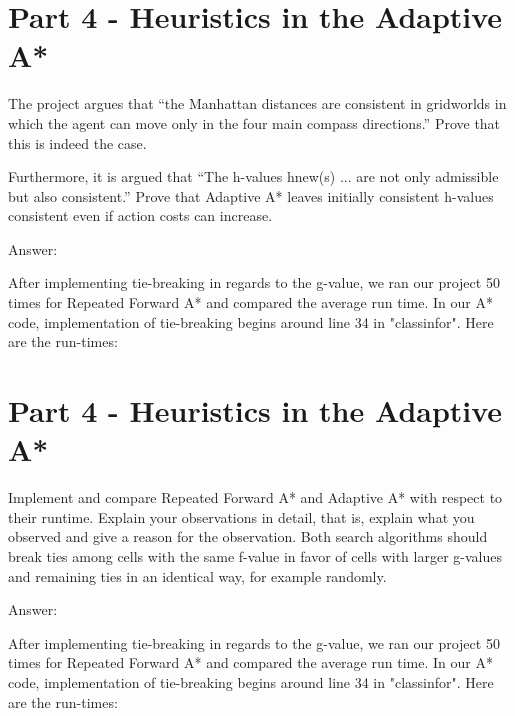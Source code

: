 \documentclass{article}
\begin{document}
\section{Part 4 - Heuristics in the Adaptive A*}

The project argues that “the Manhattan distances are consistent in
gridworlds in which the agent can move only in the four main compass directions.” Prove that this is indeed the case.

Furthermore, it is argued that “The h-values hnew(s) ... are not only admissible but also consistent.” Prove that Adaptive A*
leaves initially consistent h-values consistent even if action costs can increase.
\newline


Answer: \newline
\par After implementing tie-breaking in regards to the g-value, we ran our project 50 times for Repeated Forward A* and compared the average run time. In our A* code, implementation of tie-breaking begins around line 34 in "classinfor".
Here are the run-times:


\section{Part 4 - Heuristics in the Adaptive A*}

Implement and compare Repeated Forward A* and Adaptive A*
with respect to their runtime. Explain your observations in detail, that is, explain what you observed and give a reason for
the observation. Both search algorithms should break ties among cells with the same f-value in favor of cells with larger
g-values and remaining ties in an identical way, for example randomly.
\newline


Answer: \newline
\par After implementing tie-breaking in regards to the g-value, we ran our project 50 times for Repeated Forward A* and compared the average run time. In our A* code, implementation of tie-breaking begins around line 34 in "classinfor".
Here are the run-times:
\end{document}
